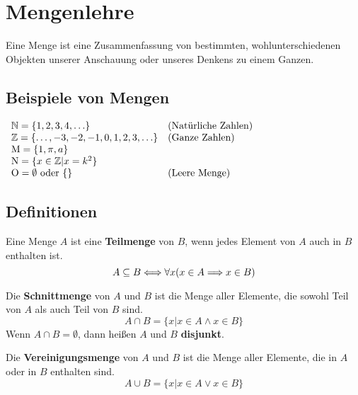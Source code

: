 \documentclass[11pt]{article}
\begin{document}
\section{Mengenlehre}
\begin{definition}
  Eine Menge ist eine Zusammenfassung von bestimmten, wohlunterschiedenen Objekten unserer Anschauung oder unseres Denkens zu einem Ganzen.
\end{definition}

\subsection{Beispiele von Mengen}
$
  \begin{array}{l l}
    \mathbb{N} = \{1, 2, 3, 4, \ldots\}                             & \text{(Natürliche Zahlen)} \\
    \mathbb{Z} = \{\ldots, -3, -2, -1, 0, 1, 2, 3, \ldots\} & \text{(Ganze Zahlen)}      \\
    \text{M} = \{1, \pi, a\}                                                             \\
    \text{N} = \{x\in\mathbb{Z} | x = k^2\}                                                      \\
    \text{O} = \emptyset\text{ oder }\{\}                   & \text{(Leere Menge)}       \\
  \end{array}
$

\subsection{Definitionen}
Eine Menge $A$ ist eine \textbf{Teilmenge} von $B$, wenn jedes Element von $A$ auch in $B$ enthalten ist.
\[
  A \subseteq B \Longleftrightarrow \forall x(x \in A \Longrightarrow x \in B)
\]

Die \textbf{Schnittmenge} von $A$ und $B$ ist die Menge aller Elemente, die sowohl Teil von $A$ als auch Teil von $B$ sind.
\[
  A \cap B = \{x | x \in A \land x \in B\}
\]
Wenn $A \cap B = \emptyset$, dann heißen $A$ und $B$ \textbf{disjunkt}.

Die \textbf{Vereinigungsmenge} von $A$ und $B$ ist die Menge aller Elemente, die in $A$ oder in $B$ enthalten sind.
\[
  A \cup B = \{x | x \in A \lor x \in B\}
\]
\end{document}
